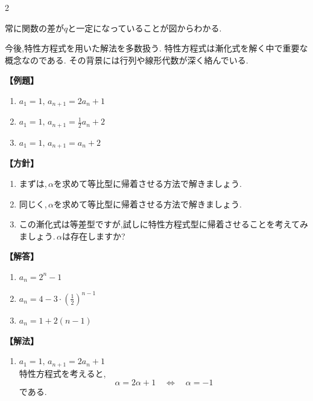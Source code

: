 \documentclass[dvipdfmx,a4paper,11pt,fleqn,openany]{jsbook}
\begin{document}
\begin{multicols*}{2}
    
    常に関数の差が$q$と一定になっていることが図からわかる.

    今後,特性方程式を用いた解法を多数扱う.
    特性方程式は漸化式を解く中で重要な概念なのである.
    その背景には行列や線形代数が深く絡んでいる.

  \noindent \textbf{【例題】}
  \begin{enumerate}[label=(\arabic*),parsep=3pt]
    \item $\displaystyle a_1=1,\, a_{n+1}=2a_n+1$
    \item $\displaystyle a_1=1,\, a_{n+1}=\frac{1}{2}a_n+2$
    \item $\displaystyle a_1=1,\, a_{n+1}=a_n+2$
  \end{enumerate}

  \noindent\textbf{【方針】}
  \begin{enumerate}[label=(\arabic*),parsep=3pt]
    \item まずは,\,$\alpha$を求めて等比型に帰着させる方法で解きましょう.
    \item 同じく,\,$\alpha$を求めて等比型に帰着させる方法で解きましょう.
    \item この漸化式は等差型ですが,試しに特性方程式型に帰着させることを考えてみましょう.\,$\alpha$は存在しますか?
  \end{enumerate}

  \noindent\textbf{【解答】}
  \begin{enumerate}[label=(\arabic*),parsep=3pt]
    \item $\displaystyle a_n=2^n-1$
    \item $\displaystyle a_n=4-3\cdot\left(\frac{1}{2}\right)^{n-1}$
    \item $\displaystyle a_n=1+2(n-1)$
  \end{enumerate}

  \noindent\textbf{【解法】}
  \begin{enumerate}[label=(\arabic*),parsep=3pt]
    \item $\displaystyle a_1=1,\,a_{n+1}=2a_n+1$\\
          特性方程式を考えると,
          \[
            \alpha=2\alpha+1
            \quad\Longleftrightarrow\quad
            \alpha=-1
          \]
          である.


\end{enumerate}
\end{multicols*}
\end{document}
